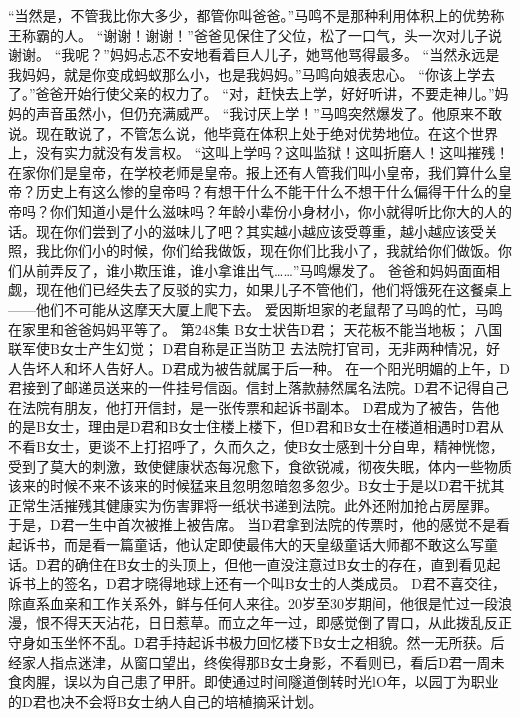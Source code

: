 \documentclass[a4paper,12pt,UTF8,twoside]{ctexbook}
\begin{document}
        “当然是，不管我比你大多少，都管你叫爸爸。”马鸣不是那种利用体积上的优势称王称霸的人。  
        “谢谢！谢谢！”爸爸见保住了父位，松了一口气，头一次对儿子说谢谢。  
        “我呢？”妈妈忐忑不安地看着巨人儿子，她骂他骂得最多。  
        “当然永远是我妈妈，就是你变成蚂蚁那么小，也是我妈妈。”马鸣向娘表忠心。  
        “你该上学去了。”爸爸开始行使父亲的权力了。  
        “对，赶快去上学，好好听讲，不要走神儿。”妈妈的声音虽然小，但仍充满威严。  
        “我讨厌上学！”马鸣突然爆发了。他原来不敢说。现在敢说了，不管怎么说，他毕竟在体积上处于绝对优势地位。在这个世界上，没有实力就没有发言权。  
        “这叫上学吗？这叫监狱！这叫折磨人！这叫摧残！在家你们是皇帝，在学校老师是皇帝。报上还有人管我们叫小皇帝，我们算什么皇帝？历史上有这么惨的皇帝吗？有想干什么不能干什么不想干什么偏得干什么的皇帝吗？你们知道小是什么滋味吗？年龄小辈份小身材小，你小就得听比你大的人的话。现在你们尝到了小的滋味儿了吧？其实越小越应该受尊重，越小越应该受关照，我比你们小的时候，你们给我做饭，现在你们比我小了，我就给你们做饭。你们从前弄反了，谁小欺压谁，谁小拿谁出气……”马鸣爆发了。  
        爸爸和妈妈面面相觑，现在他们已经失去了反驳的实力，如果儿子不管他们，他们将饿死在这餐桌上——他们不可能从这摩天大厦上爬下去。  
        爱因斯坦家的老鼠帮了马鸣的忙，马鸣在家里和爸爸妈妈平等了。          第248集  
        B女士状告D君；  
        天花板不能当地板；  
        八国联军使B女士产生幻觉；  
        D君自称是正当防卫    
        去法院打官司，无非两种情况，好人告坏人和坏人告好人。D君成为被告就属于后一种。  
        在一个阳光明媚的上午，D君接到了邮递员送来的一件挂号信函。信封上落款赫然属名法院。D君不记得自己在法院有朋友，他打开信封，是一张传票和起诉书副本。  
        D君成为了被告，告他的是B女士，理由是D君和B女士住楼上楼下，但D君和B女士在楼道相遇时D君从不看B女士，更谈不上打招呼了，久而久之，使B女士感到十分自卑，精神恍惚，受到了莫大的刺激，致使健康状态每况愈下，食欲锐减，彻夜失眠，体内一些物质该来的时候不来不该来的时候猛来且忽明忽暗忽多忽少。B女士于是以D君干扰其正常生活摧残其健康实为伤害罪将一纸状书递到法院。此外还附加抢占房屋罪。  
        于是，D君一生中首次被推上被告席。  
        当D君拿到法院的传票时，他的感觉不是看起诉书，而是看一篇童话，他认定即使最伟大的天皇级童话大师都不敢这么写童话。D君的确住在B女士的头顶上，但他一直没注意过B女士的存在，直到看见起诉书上的签名，D君才晓得地球上还有一个叫B女士的人类成员。  
        D君不喜交往，除直系血亲和工作关系外，鲜与任何人来往。20岁至30岁期间，他很是忙过一段浪漫，恨不得天天沾花，日日惹草。而立之年一过，即感觉倒了胃口，从此拨乱反正守身如玉坐怀不乱。D君手持起诉书极力回忆楼下B女士之相貌。然一无所获。后经家人指点迷津，从窗口望出，终俟得那B女士身影，不看则已，看后D君一周未食肉腥，误以为自己患了甲肝。即使通过时间隧道倒转时光lO年，以园丁为职业的D君也决不会将B女士纳人自己的培植摘采计划。  
\end{document}

